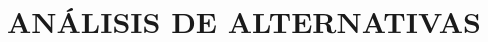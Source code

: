 \chapter[Análisis de alternativas]{
  \label{chp:analisisdealternativas}
  ANÁLISIS DE ALTERNATIVAS
}
\thispagestyle{numberingStyle}
\pagestyle{numberingStyle}
















